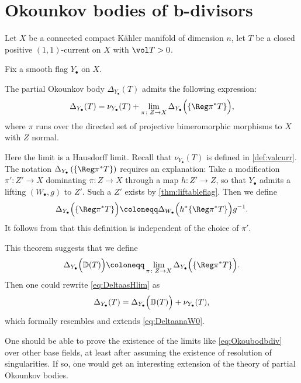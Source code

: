\section{Okounkov bodies of b-divisors}\label{sec:Okounkovbdiv}

Let $X$ be a connected compact Kähler manifold of dimension $n$, let $T$ be a closed positive $(1,1)$-current on $X$ with $\vol T>0$.

Fix a smooth flag $Y_{\bullet}$ on $X$.

\begin{theorem}\label{thm:pobbd}
     The partial Okounkov body $\Delta_{Y_{\bullet}}(T)$ admits the following expression:
    \begin{equation}\label{eq:DeltaasHlim}
    \Delta_{Y_{\bullet}}(T)=\nu_{Y_{\bullet}}(T)+\lim_{\pi\colon Z\rightarrow X} \Delta_{Y_{\bullet}}\Bigl( \{\Reg \pi^*T\}\Bigr),
    \end{equation}
    where $\pi$ runs over the directed set of projective bimeromorphic morphisms to $X$ with $Z$ normal.
\end{theorem}
Here the limit is a Hausdorff limit. Recall that $\nu_{Y_{\bullet}}(T)$ is defined in \cref{def:valcurr}. The notation $\Delta_{Y_{\bullet}}\left( \{\Reg \pi^*T\}\right)$ requires an explanation: Take a modification $\pi'\colon Z'\rightarrow X$ dominating $\pi\colon Z\rightarrow X$ through a map $h\colon Z'\rightarrow Z$, so that $Y_{\bullet}$ admits a lifting $(W_{\bullet},g)$ to $Z'$. Such a $Z'$ exists by \cref{thm:liftableflag}. Then we define
\[
\Delta_{Y_{\bullet}}\Bigl( \{\Reg \pi^*T\}\Bigr)\coloneqq \Delta_{W_{\bullet}}\Bigl( h^*\{\Reg \pi^*T\}\Bigr)g^{-1}.
\]
It follows from  that this definition is independent of the choice of $\pi'$.


This theorem suggests that we define
\begin{equation}\label{eq:Okoubodbdiv}
\Delta_{Y_{\bullet}}\Bigl( \mathbb{D}(T) \Bigr)\coloneqq \lim_{\pi\colon Z\rightarrow X} \Delta_{Y_{\bullet}}\Bigl( \{\Reg \pi^*T\}\Bigr).
\end{equation}
Then one could rewrite \eqref{eq:DeltaasHlim} as
\[
\Delta_{Y_{\bullet}}(T)=\Delta_{Y_{\bullet}}\Bigl( \mathbb{D}(T) \Bigr)+\nu_{Y_{\bullet}}(T),
\]
which formally resembles and extends \eqref{eq:DeltaanaW0}.
\begin{remark}\label{rmk:bdiv-sec-11-3:L30}
One should be able to prove the existence of the limits like \eqref{eq:Okoubodbdiv} over other base fields, at least after assuming the existence of resolution of singularities. If so, one would get an interesting extension of the theory of partial Okounkov bodies.
\end{remark}

